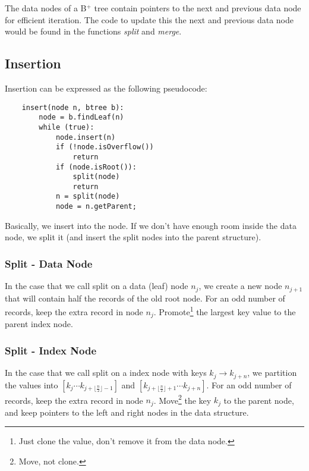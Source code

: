 				The data nodes of a B$^+$ tree contain pointers to the next and previous data node for efficient iteration.
				The code to update this the next and previous data node would be found in the functions \emph{split} and \emph{merge}.

                \subsection{Insertion} %
                \label{sub:insertion}


                    Insertion can be expressed as the following pseudocode:
                    \begin{verbatim}
    insert(node n, btree b):
        node = b.findLeaf(n)
        while (true):
            node.insert(n)
            if (!node.isOverflow())
                return
            if (node.isRoot()):
                split(node)
                return
            n = split(node)
            node = n.getParent;
                    \end{verbatim}
                    Basically, we insert into the node.
                    If we don't have enough room inside the data node, we split it (and insert the split nodes into the parent structure).

                    \subsubsection{Split - Data Node} %
                    \label{ssub:split_data_node}
                        In the case that we call split on a data (leaf) node $n_j$, we create a new node $n_{j+1}$ that will contain half the records of the old root node.
                        For an odd number of records, keep the extra record in node $n_j$.
                        Promote\footnote{Just clone the value, don't remove it from the data node.} the largest key value to the parent index node.
                    \subsubsection{Split - Index Node} %
                    \label{ssub:split_index_node}
					In the case that we call split on a index node with keys $k_j \to k_{j+n}$, we partition the values into $[k_j \cdots k_{j+ \lfloor\frac{n}{2}\rfloor - 1}]$ and $[k_{j+ \lfloor\frac{n}{2}\rfloor + 1} \cdots  k_{j+n}]$.
                        For an odd number of records, keep the extra record in node $n_j$.
                        Move\footnote{Move, not clone.} the key $k_j$ to the parent node, and keep pointers to the left and right nodes in the data structure.
